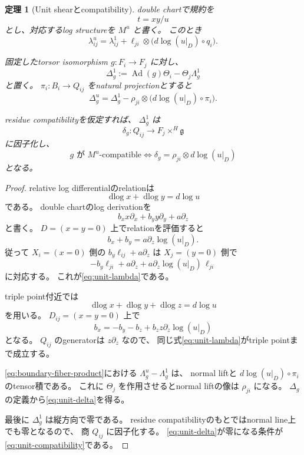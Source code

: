 \documentclass[uplatex,dvipdfmx,11pt]{jsarticle}
\numberwithin{equation}{section}
\theoremstyle{plain}
\newtheorem{theorem}{定理}[section]
\theoremstyle{definition}
\theoremstyle{remark}
\DeclareMathOperator{\Ad}{Ad}
\DeclareMathOperator{\dlog}{dlog}
\newcommand{\g}{\mathfrak g}
\begin{document}
\begin{theorem}[Unit shearとcompatibility]
\label{thm:unit-variation}
double chartで規約を
\[
t=xy/u
\]
とし、対応するlog structureを \(M^u\) と書く。
このとき
\begin{equation}
\label{eq:unit-lambda}
\lambda^u_{ij}
=
\lambda^1_{ij}
+\ell_{ji}\otimes
\bigl(d\log(u|_D)\circ q_i\bigr).
\end{equation}

固定したtorsor isomorphism \(g:F_i\to F_j\) に対し、
\[
\Delta_g^1:=\Ad(g)\Theta_i-\Theta_j\Lambda_g^1
\]
と置く。
\(\pi_i:B_i\to Q_{ij}\) をnatural projectionとすると
\begin{equation}
\label{eq:unit-delta}
\Delta_g^u
=
\Delta_g^1-
\rho_{ji}\otimes
\bigl(d\log(u|_D)\circ\pi_i\bigr).
\end{equation}

residue compatibilityを仮定すれば、
\(\Delta_g^1\) は
\[
\delta_g:Q_{ij}\longrightarrow F_j\times^H\g
\]
に因子化し、
\begin{equation}
\label{eq:unit-compatibility}
g\text{ が }M^u\text{-compatible}
\iff
\delta_g=\rho_{ji}\otimes d\log(u|_D)
\end{equation}
となる。
\end{theorem}

\begin{proof}
relative log differentialのrelationは
\[
\dlog x+\dlog y=d\log u
\]
である。
double chartのlog derivationを
\[
b_xx\partial_x+b_yy\partial_y+a\partial_z
\]
と書く。
\(D=(x=y=0)\) 上でrelationを評価すると
\[
b_x+b_y=a\partial_z\log(u|_D).
\]
従って \(X_i=(x=0)\) 側の
\(b_y\ell_{ij}+a\partial_z\)
は \(X_j=(y=0)\) 側で
\[
-b_y\ell_{ji}+a\partial_z
+a\partial_z\log(u|_D)\,\ell_{ji}
\]
に対応する。
これが\eqref{eq:unit-lambda}である。

triple point付近では
\[
\dlog x+\dlog y+\dlog z=d\log u
\]
を用いる。
\(D_{ij}=(x=y=0)\) 上で
\[
b_x=-b_y-b_z+b_z z\partial_z\log(u|_D)
\]
となる。
\(Q_{ij}\) のgeneratorは \(z\partial_z\) なので、
同じ式\eqref{eq:unit-lambda}がtriple pointまで成立する。

\eqref{eq:boundary-fiber-product}における
\(\Lambda_g^u-\Lambda_g^1\) は、
normal liftと \(d\log(u|_D)\circ\pi_i\) のtensor積である。
これに \(\Theta_j\) を作用させるとnormal liftの像は \(\rho_{ji}\) になる。
\(\Delta_g\) の定義から\eqref{eq:unit-delta}を得る。

最後に \(\Delta_g^1\) は縦方向で零である。
residue compatibilityのもとではnormal line上でも零となるので、
商 \(Q_{ij}\) に因子化する。
\eqref{eq:unit-delta}が零になる条件が
\eqref{eq:unit-compatibility}である。
\end{proof}
\end{document}
